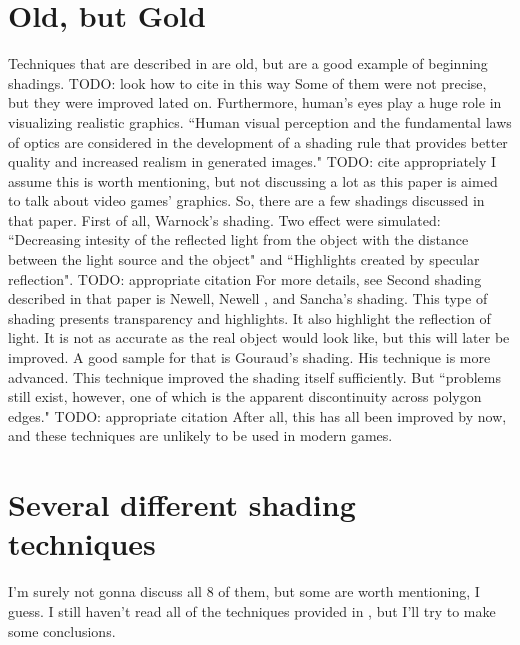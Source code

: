 \documentclass{scrartcl}
\begin{document}
\section{Old, but Gold}
Techniques that are described in \cite{phong1975illumination} are old, but are a good example of beginning shadings. TODO: look how to cite in this way
Some of them were not precise, but they were improved lated on.
Furthermore, human's eyes play a huge role in visualizing realistic graphics.
``Human visual perception and the fundamental laws of optics are considered in the development of a shading rule that provides better quality and increased realism in generated images."  \cite{phong1975illumination} TODO: cite appropriately
I assume this is worth mentioning, but not discussing a lot as this paper is aimed to talk about video games' graphics.
So, there are a few shadings discussed in that paper.
First of all, Warnock's shading.
Two effect were simulated: ``Decreasing intesity of the reflected light from the object with the distance between the light source and the object"
and ``Highlights created by specular reflection". TODO: appropriate citation
For more details, see \cite{phong1975illumination}
Second shading described in that paper is Newell, Newell , and Sancha's shading.
This type of shading presents transparency and highlights.
It also highlight the reflection of light.
It is not as accurate as the real object would look like, but this will later be improved.
A good sample for that is Gouraud's shading.
His technique is more advanced.
This technique improved the shading itself sufficiently.
But ``problems still exist, however, one of which is the apparent discontinuity across polygon edges." TODO: appropriate citation
After all, this has all been improved by now, and these techniques are unlikely to be used in modern games.

\section{Several different shading techniques}
I'm surely not gonna discuss all 8 of them, but some are worth mentioning, I guess.
I still haven't read all of the techniques provided in \cite{zhang1994analysis}, but I'll try to make some conclusions.




\end{document}

